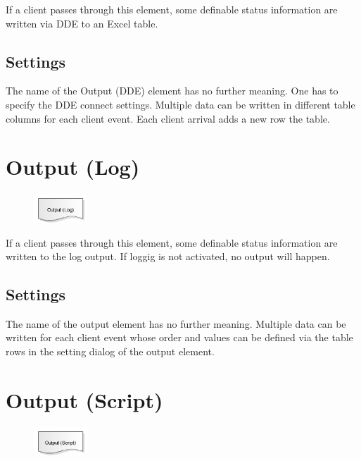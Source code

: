 If a client passes through this element, some definable status information are written via DDE to an Excel table.

\subsection*{Settings}

The name of the Output (DDE) element has no further meaning. One has to specify the DDE connect settings.  
Multiple data can be written in different table columns for each client event. Each client arrival
adds a new row the table.


\section{Output (Log)}
\label{ref:ModelElementOutputLog}

\begin{figure}
\vspace{-22pt}
\includegraphics[width=2cm]{imageModelElementOutputLog.png}
\vspace{-22pt}
\end{figure}

If a client passes through this element, some definable status information are written to the log output.
If loggig is not activated, no output will happen.

\subsection*{Settings}

The name of the output element has no further meaning. Multiple data can be written for each client event whose order and
values can be defined via the table rows in the setting dialog of the output element.


\section{Output (Script)}
\label{ref:ModelElementOutputJS}

\begin{figure}
\vspace{-22pt}
\includegraphics[width=2cm]{imageModelElementOutputJS.png}
\vspace{-22pt}
\end{figure}

